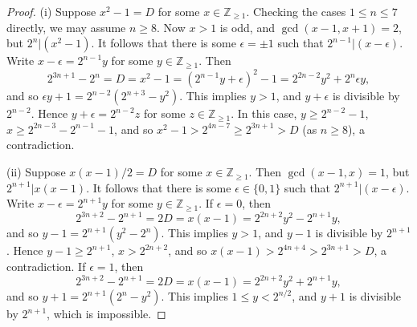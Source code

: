 \documentclass[11pt]{amsart}
\theoremstyle{plain}
\theoremstyle{definition}
\numberwithin{thm}{section}
\numberwithin{equation}{thm}
\newcommand{\eps}{\epsilon}
\newcommand{\Z}{{\mathbb Z}}
\newcommand{\0}{\emptyset}
\begin{document}
\begin{proof}
(i) Suppose $x^2-1=D$ for some $x \in \Z_{\geq 1}$. Checking the cases $1 \leq n \leq 7$ directly, we may assume $n \geq 8$. 
Now $x > 1$ is odd, and $\gcd(x-1,x+1)=2$, but $2^n|(x^2-1)$. It follows that there is some $\eps= \pm 1$ such that
$2^{n-1}|(x-\eps)$. Write $x-\eps = 2^{n-1}y$ for some $y \in \Z_{\geq 1}$. Then 
$$2^{3n+1}-2^n = D = x^2-1=(2^{n-1}y+\eps)^2-1 = 2^{2n-2}y^2+2^n\eps y,$$
and so $\eps y+1 = 2^{n-2}(2^{n+3}-y^2)$. This implies $y > 1$, and $y+\eps$ is divisible by $2^{n-2}$. Hence 
$y+\eps = 2^{n-2}z$ for some $z \in \Z_{\geq 1}$.  In this case, $y \geq 2^{n-2}-1$, $x \geq 2^{2n-3}-2^{n-1}-1$,
and so $x^2-1 > 2^{4n-7} \geq 2^{3n+1} > D$ (as $n \geq 8$), a contradiction.

\smallskip
(ii) Suppose $x(x-1)/2=D$ for some $x \in \Z_{\geq 1}$. 
Then $\gcd(x-1,x)=1$, but $2^{n+1}|x(x-1)$. It follows that there is some $\eps \in \{0,1\}$ such that
$2^{n+1}|(x-\eps)$. Write $x-\eps = 2^{n+1}y$ for some $y \in \Z_{\geq 1}$. If $\eps=0$, then
$$2^{3n+2}-2^{n+1} = 2D = x(x-1)=2^{2n+2}y^2-2^{n+1}y,$$
and so $y-1 = 2^{n+1}(y^2-2^{n})$. This implies $y > 1$, and $y-1$ is divisible by $2^{n+1}$. Hence 
$y-1 \geq 2^{n+1}$, $x > 2^{2n+2}$,
and so $x(x-1) > 2^{4n+4} > 2^{3n+1}> D$, a contradiction.
If $\eps=1$, then
$$2^{3n+2}-2^{n+1} = 2D = x(x-1)=2^{2n+2}y^2+2^{n+1}y,$$
and so $y+1 = 2^{n+1}(2^{n}-y^2)$. This implies $1 \leq y < 2^{n/2}$, and $y+1$ is divisible by $2^{n+1}$, which is impossible. 


\end{proof}
\end{document}
